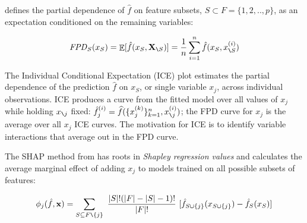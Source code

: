 \documentclass[]{article} %
\newcommand{\cut}[1]{}
\newcommand{\xnj}{$x_{\texttt{\char`\\} j}$}
\renewcommand{\slash}{\texttt{\char`\\}}
\DeclareMathOperator{\Ex}{\mathbb{E}}
\begin{document}
\citet{PDP} defines the partial dependence of $\hat{f}$ on feature subsets, $S \subset F = \{1, 2, .., p\}$, as an expectation conditioned on the remaining variables:\vspace{-2mm}

\begin{equation}
{\it FPD}_S(x_S) = \Ex[\hat{f}(x_S,{\bf X}_{\slash S})] = \frac{1}{n} \sum_{i=1}^n \hat{f}(x_S, x_{\slash S}^{(i)})
\end{equation}\vspace{-2mm}

\cut{
\[
{\it FPD}_j(x_j=z) = \Ex[\hat{f}(x_{j}=z,{\bf X}_{\slash j})] = \frac{1}{n} \sum_{i=1}^n \hat{f}(x_j=z, x_{\slash j}^{(i)})
\]
}

\cut{
\noindent FPD replaces ${\bf X}_j$ with $z$ then computes the average model output for the altered $x^{(i)}$.
}


The Individual Conditional Expectation (ICE) plot \citep{ICE} estimates the partial dependence of the prediction $\hat{f}$ on $x_S$, or single variable $x_j$, across individual observations. ICE produces a curve from the fitted model over all values of $x_j$ while holding \xnj{} fixed: $\hat{f}^{(i)}_j = \widehat{f}(\{x_j^{(k)}\}_{k = 1}^n, x_{\slash j}^{(i)})$;  the FPD curve for  $x_j$ is the average over all $x_j$ ICE curves. The motivation for ICE is to identify variable interactions that average out in the FPD curve. 


The SHAP method from \citet{shap} has roots in {\em Shapley regression values} \citep{shapley-regression} and calculates the average marginal effect of adding $x_j$ to models trained on all possible  subsets of features:
\vspace{-1mm}

\begin{equation}\label{eq:shap}
\phi_j(\hat{f},{\bf x}) = \sum_{S \subseteq F \slash \{j\}}\
\frac{|S|!(|F|-|S|-1)!}{|F|!}\
 [ \hat{f}_{S \cup \{j\}}(x_{S \cup \{j\}}) - \hat{f}_S(x_S) ]
\end{equation}\vspace{-1mm}
\end{document}
